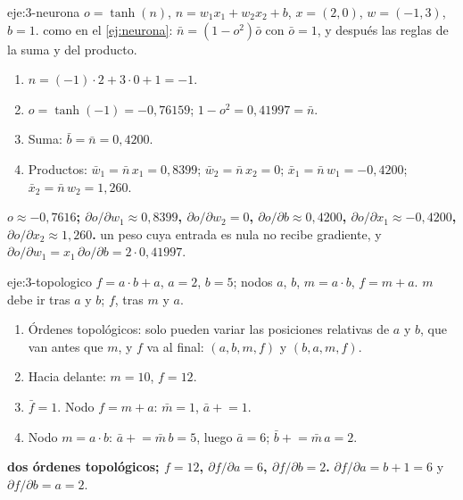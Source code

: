 \begin{solucion}{eje:3-neurona}
\datos $o=\tanh(n)$, $n=w_1x_1+w_2x_2+b$, $x=(2,0)$, $w=(-1,3)$, $b=1$.
\planteamiento como en el \cref{ej:neurona}: $\bar n=(1-o^{2})\bar o$ con $\bar o=1$, y después las reglas de la suma y del producto.
\pasos
\begin{enumerate}[label=\arabic*.]
  \item $n=(-1)\cdot 2+3\cdot 0+1=-1$.
  \item $o=\tanh(-1)=-0{,}76159$; $1-o^{2}=0{,}41997=\bar n$.
  \item Suma: $\bar b=\bar n=0{,}4200$.
  \item Productos: $\bar w_1=\bar n\,x_1=0{,}8399$; $\bar w_2=\bar n\,x_2=0$; $\bar x_1=\bar n\,w_1=-0{,}4200$; $\bar x_2=\bar n\,w_2=1{,}260$.
\end{enumerate}
\resultado \textbf{$o\approx-0{,}7616$; $\partial o/\partial w_1\approx 0{,}8399$, $\partial o/\partial w_2=0$, $\partial o/\partial b\approx 0{,}4200$, $\partial o/\partial x_1\approx-0{,}4200$, $\partial o/\partial x_2\approx 1{,}260$.}
\comprobacion un peso cuya entrada es nula no recibe gradiente, y $\partial o/\partial w_1=x_1\,\partial o/\partial b=2\cdot 0{,}41997$.
\end{solucion}

\begin{solucion}{eje:3-topologico}
\datos $f=a\cdot b+a$, $a=2$, $b=5$; nodos $a$, $b$, $m=a\cdot b$, $f=m+a$.
\planteamiento $m$ debe ir tras $a$ y $b$; $f$, tras $m$ y $a$.
\pasos
\begin{enumerate}[label=\arabic*.]
  \item Órdenes topológicos: solo pueden variar las posiciones relativas de $a$ y $b$, que van antes que $m$, y $f$ va al final: $(a,b,m,f)$ y $(b,a,m,f)$.
  \item Hacia delante: $m=10$, $f=12$.
  \item $\bar f=1$. Nodo $f=m+a$: $\bar m=1$, $\bar a\mathrel{+}=1$.
  \item Nodo $m=a\cdot b$: $\bar a\mathrel{+}=\bar m\,b=5$, luego $\bar a=6$; $\bar b\mathrel{+}=\bar m\,a=2$.
\end{enumerate}
\resultado \textbf{dos órdenes topológicos; $f=12$, $\partial f/\partial a=6$, $\partial f/\partial b=2$.}
\comprobacion $\partial f/\partial a=b+1=6$ y $\partial f/\partial b=a=2$.
\end{solucion}

